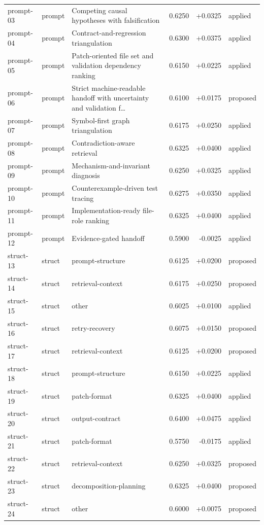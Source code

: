 \begin{center}
\begin{longtable}{llp{5.2cm}rrl}
prompt-03 & prompt & Competing causal hypotheses with falsification & 0.6250 & +0.0325 & applied \\
prompt-04 & prompt & Contract-and-regression triangulation & 0.6300 & +0.0375 & applied \\
prompt-05 & prompt & Patch-oriented file set and validation dependency ranking & 0.6150 & +0.0225 & applied \\
prompt-06 & prompt & Strict machine-readable handoff with uncertainty and validation f\ldots{} & 0.6100 & +0.0175 & proposed \\
prompt-07 & prompt & Symbol-first graph triangulation & 0.6175 & +0.0250 & applied \\
prompt-08 & prompt & Contradiction-aware retrieval & 0.6325 & +0.0400 & applied \\
prompt-09 & prompt & Mechanism-and-invariant diagnosis & 0.6250 & +0.0325 & applied \\
prompt-10 & prompt & Counterexample-driven test tracing & 0.6275 & +0.0350 & applied \\
prompt-11 & prompt & Implementation-ready file-role ranking & 0.6325 & +0.0400 & applied \\
prompt-12 & prompt & Evidence-gated handoff & 0.5900 & -0.0025 & applied \\
struct-13 & struct & prompt-structure & 0.6125 & +0.0200 & proposed \\
struct-14 & struct & retrieval-context & 0.6175 & +0.0250 & proposed \\
struct-15 & struct & other & 0.6025 & +0.0100 & applied \\
struct-16 & struct & retry-recovery & 0.6075 & +0.0150 & proposed \\
struct-17 & struct & retrieval-context & 0.6125 & +0.0200 & proposed \\
struct-18 & struct & prompt-structure & 0.6150 & +0.0225 & applied \\
struct-19 & struct & patch-format & 0.6325 & +0.0400 & applied \\
struct-20 & struct & output-contract & 0.6400 & +0.0475 & applied \\
struct-21 & struct & patch-format & 0.5750 & -0.0175 & applied \\
struct-22 & struct & retrieval-context & 0.6250 & +0.0325 & proposed \\
struct-23 & struct & decomposition-planning & 0.6325 & +0.0400 & proposed \\
struct-24 & struct & other & 0.6000 & +0.0075 & proposed \\

\end{longtable}
\end{center}
